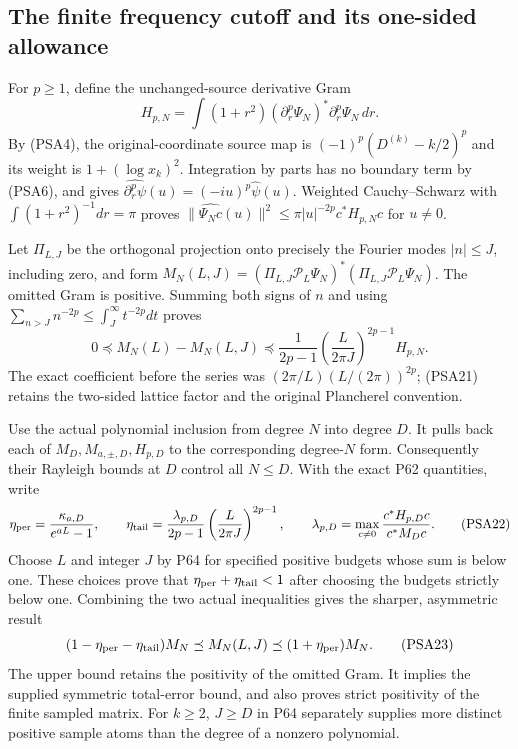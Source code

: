 \subsection{The finite frequency cutoff and its one-sided allowance}

For $p\ge1$, define the unchanged-source derivative Gram
\[
 H_{p,N}=\int(1+r^2)(\partial_r^p\Psi_N)^*
                            \partial_r^p\Psi_N\,dr.
 \tag{PSA20}
\]
By (PSA4), the original-coordinate source map is
$(-1)^p(D^{(k)}-k/2)^p$ and its weight is
$1+(\log x_k)^2$. Integration by parts has no boundary term by
(PSA6), and gives
$\widehat{\partial_r^p\psi}(u)=(-iu)^p\widehat\psi(u)$.
Weighted Cauchy--Schwarz with
$\int(1+r^2)^{-1}dr=\pi$ proves
$\|\widehat{\Psi_Nc}(u)\|^2\le\pi|u|^{-2p}c^*H_{p,N}c$
for $u\ne0$.

Let $\Pi_{L,J}$ be the orthogonal projection onto precisely the
Fourier modes $|n|\le J$, including zero, and form
$M_N(L,J)=(\Pi_{L,J}\mathcal P_L\Psi_N)^*
                (\Pi_{L,J}\mathcal P_L\Psi_N)$.
The omitted Gram is positive. Summing both signs of $n$ and using
$\sum_{n>J}n^{-2p}\le\int_J^\infty t^{-2p}dt$ proves
\[
 0\preceq M_N(L)-M_N(L,J)
 \preceq\frac1{2p-1}
             \left(\frac{L}{2\pi J}\right)^{2p-1}H_{p,N}.
 \tag{PSA21}
\]
The exact coefficient before the series was
$(2\pi/L)(L/(2\pi))^{2p}$; (PSA21) retains the two-sided lattice
factor and the original Plancherel convention.

Use the actual polynomial inclusion from degree $N$ into degree $D$.
It pulls back each of $M_D,M_{a,\pm,D},H_{p,D}$ to the corresponding
degree-$N$ form. Consequently their Rayleigh bounds at $D$ control all
$N\le D$. With the exact P62 quantities, write
\[
 \eta_{\rm per}=\frac{\kappa_{a,D}}{e^{aL}-1},\qquad
 \eta_{\rm tail}=\frac{\lambda_{p,D}}{2p-1}
          \left(\frac{L}{2\pi J}\right)^{2p-1},\qquad
 \lambda_{p,D}=\max_{c\ne0}\frac{c^*H_{p,D}c}{c^*M_Dc}.
 \tag{PSA22}
\]
Choose $L$ and integer $J$ by P64 for specified positive budgets
whose sum is below one. These choices prove that
$\eta_{\rm per}+\eta_{\rm tail}<1$ after choosing the budgets
strictly below one. Combining the two actual inequalities gives the
sharper, asymmetric result
\[
 (1-\eta_{\rm per}-\eta_{\rm tail})M_N
 \preceq M_N(L,J)\preceq(1+\eta_{\rm per})M_N.
 \tag{PSA23}
\]
The upper bound retains the positivity of the omitted Gram. It implies
the supplied symmetric total-error bound, and also proves strict
positivity of the finite sampled matrix. For $k\ge2$, $J\ge D$ in
P64 separately supplies more distinct positive sample atoms than the
degree of a nonzero polynomial.

